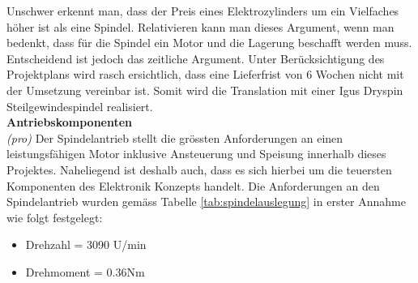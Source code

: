 Unschwer erkennt man, dass der Preis eines Elektrozylinders um ein Vielfaches höher ist als eine Spindel. Relativieren kann man dieses Argument, wenn man bedenkt, dass für die Spindel ein Motor und die Lagerung beschafft werden muss. Entscheidend ist jedoch das zeitliche Argument. Unter Berücksichtigung des Projektplans wird rasch ersichtlich, dass eine Lieferfrist von 6 Wochen nicht mit der Umsetzung vereinbar ist. Somit wird die Translation mit einer Igus Dryspin Steilgewindespindel realisiert.\\

\textbf{Antriebskomponenten}\\
\textit{(pro)} Der Spindelantrieb stellt die grössten Anforderungen an einen leistungsfähigen Motor inklusive Ansteuerung und Speisung innerhalb dieses Projektes. Naheliegend ist deshalb auch, dass es sich hierbei um die teuersten Komponenten des Elektronik Konzepts handelt. Die Anforderungen an den Spindelantrieb wurden gemäss Tabelle \ref{tab:spindelauslegung} in erster Annahme wie folgt festgelegt: 

\begin{itemize}
	\item Drehzahl = 3090 U/min
	\item Drehmoment = 0.36Nm	
\end{itemize}



